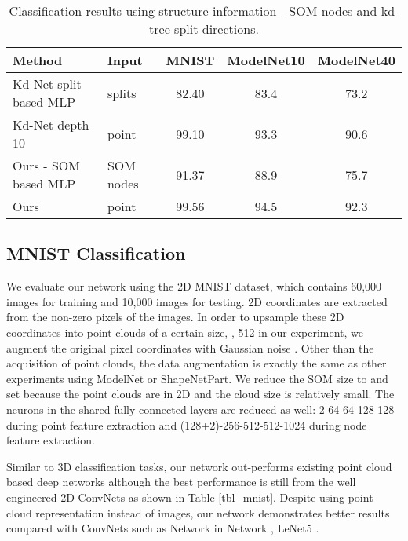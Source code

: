 \documentclass[10pt,twocolumn,letterpaper]{article}
\begin{document}
\begin{table*}[th]
\centering
\begin{tabular}{ll|ccc}
\hline
Method                                            & Input     & MNIST & ModelNet10 & ModelNet40 \\ \hline
Kd-Net split based MLP \cite{klokov2017escape}    & splits    & 82.40  & 83.4       & 73.2       \\
Kd-Net depth 10 \cite{klokov2017escape}           & point     & 99.10  & 93.3       & 90.6       \\ \hline
Ours - SOM based MLP                              & SOM nodes & 91.37  & 88.9       & 75.7       \\
Ours                                              & point     & 99.56  & 94.5       & 92.3       \\ \hline
\end{tabular}
\caption{Classification results using structure information - SOM nodes and kd-tree split directions. } \label{tbl_som_cls}
\end{table*}

\subsection{MNIST Classification} 
We evaluate our network using the 2D MNIST dataset, which contains 60,000  images for training and 10,000 images for testing. 2D coordinates are extracted from the non-zero pixels of the images. In order to upsample these 2D coordinates into point clouds of a certain size, \eg, 512 in our experiment, we augment the original pixel coordinates with Gaussian noise . Other than the acquisition of point clouds, the data augmentation is exactly the same as other experiments using ModelNet or ShapeNetPart. We reduce the SOM size to  and set  because the point clouds are in 2D and the cloud size is relatively small. The neurons in the shared fully connected layers are reduced as well: 2-64-64-128-128 during point feature extraction and (128+2)-256-512-512-1024 during node feature extraction.

Similar to 3D classification tasks, our network out-performs existing point cloud based deep networks although the best performance is still from the well engineered 2D ConvNets as shown in Table \ref{tbl_mnist}. Despite using point cloud representation instead of images, our network demonstrates better results compared with ConvNets such as Network in Network \cite{lin2013network}, LeNet5 \cite{lecun1998gradient}.
\end{document}
